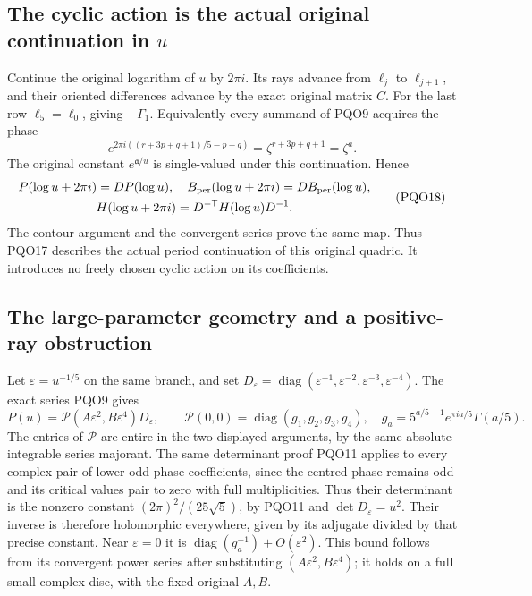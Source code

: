 \documentclass[11pt,a4paper]{article}
\begin{document}
\subsection{The cyclic action is the actual original continuation in \texorpdfstring{$u$}{u}}
Continue the original logarithm of $u$ by $2\pi i$. Its rays
advance from $\ell_j$ to $\ell_{j+1}$, and their oriented
differences advance by the exact original matrix $C$.
For the last row $\ell_5=\ell_0$, giving $-\Gamma_1$.
Equivalently every summand of PQO9 acquires the phase
\[
 e^{2\pi i((r+3p+q+1)/5-p-q)}
       =\zeta^{r+3p+q+1}=\zeta^a.
\]
The original constant $e^{\mathfrak a/u}$ is single-valued
under this continuation. Hence
\[
\begin{gathered}
 P(\log u+2\pi i)=DP(\log u),\quad
 B_{\rm per}(\log u+2\pi i)=DB_{\rm per}(\log u),\\
 H(\log u+2\pi i)=D^{-\mathsf T}H(\log u)D^{-1}.
\end{gathered}\tag{PQO18}
\]
The contour argument and the convergent series prove the same
map. Thus PQO17 describes the actual period continuation of
this original quadric. It introduces no freely chosen cyclic
action on its coefficients.

\subsection{The large-parameter geometry and a positive-ray obstruction}
Let $\varepsilon=u^{-1/5}$ on the same branch, and set
$D_\varepsilon=\operatorname{diag}(\varepsilon^{-1},
\varepsilon^{-2},\varepsilon^{-3},\varepsilon^{-4})$.
The exact series PQO9 gives
\[
 P(u)=\mathscr P(A\varepsilon^2,B\varepsilon^4)D_\varepsilon,
 \qquad
 \mathscr P(0,0)=\operatorname{diag}(g_1,g_2,g_3,g_4),
 \quad g_a=5^{a/5-1}e^{\pi ia/5}\Gamma(a/5).
 \tag{PQO19}
\]
The entries of $\mathscr P$ are entire in the two displayed
arguments, by the same absolute integrable series majorant.
The same determinant proof PQO11 applies to every complex pair
of lower odd-phase coefficients, since the centred phase remains
odd and its critical values pair to zero with full multiplicities.
Thus their determinant is the nonzero constant
$(2\pi)^2/(25\sqrt5)$, by PQO11 and $\det D_\varepsilon=u^2$.
Their inverse is therefore holomorphic everywhere, given by its
adjugate divided by that precise constant. Near $\varepsilon=0$
it is $\operatorname{diag}(g_a^{-1})+O(\varepsilon^2)$.
This bound follows from its convergent power series after
substituting $(A\varepsilon^2,B\varepsilon^4)$; it holds on
a full small complex disc, with the fixed original $A,B$.
\end{document}
